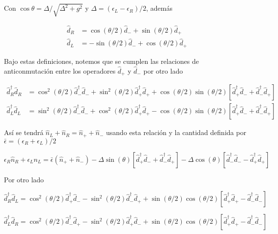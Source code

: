 \begin{appendixs}
Con $\cos \theta = \Delta/\sqrt{ \Delta^{2} + g^{2} }$ y $\Delta = (\epsilon_{L} - \epsilon_{R})/2$, además  

\begin{align*}
    \hat{d}_{R} & = \cos(\theta/2)\hat{d}_{-} + \sin(\theta/2)\hat{d}_{+} \\
    \hat{d}_{L} & = -\sin(\theta/2)\hat{d}_{-} + \cos(\theta/2)\hat{d}_{+}
\end{align*}

Bajo estas definiciones, notemos que se cumplen las relaciones de anticonmutación entre los operadores $\hat{d}_{+}$ y $\hat{d}_{-}$ por otro lado

\begin{align*}
    \hat{d}^{\dagger}_{R}\hat{d}_{R} & = \cos^{2}(\theta/2) \hat{d}^{\dagger}_{-}\hat{d}_{-} + \sin^{2}(\theta/2) \hat{d}^{\dagger}_{+}\hat{d}_{+} + \cos(\theta/2)\sin(\theta/2)[\hat{d}^{\dagger}_{+}\hat{d}_{-} + \hat{d}^{\dagger}_{-}\hat{d}_{+} ] \\
    \hat{d}^{\dagger}_{L}\hat{d}_{L} & = \sin^{2}(\theta/2) \hat{d}^{\dagger}_{-}\hat{d}_{-} + \cos^{2}(\theta/2) \hat{d}^{\dagger}_{+}\hat{d}_{+} - \cos(\theta/2)\sin(\theta/2)[\hat{d}^{\dagger}_{+}\hat{d}_{-} + \hat{d}^{\dagger}_{-}\hat{d}_{+} ]
\end{align*}

Así se tendrá $\hat{n}_{L} + \hat{n}_{R} = \hat{n}_{+} + \hat{n}_{-}$ usando esta relación y la cantidad definida por $\bar{\epsilon} = (\epsilon_{R} + \epsilon_{L})/2$ 

\begin{equation}
    \epsilon_{R} \hat{n}_{R} + \epsilon_{L} \hat{n}_{L}  = \bar{\epsilon}( \hat{n}_{+} + \hat{n}_{-} ) - \Delta \sin(\theta) [\hat{d}^{\dagger}_{+}\hat{d}_{-} + \hat{d}^{\dagger}_{-}\hat{d}_{+}] - \Delta \cos(\theta) [\hat{d}^{\dagger}_{-}\hat{d}_{-} - \hat{d}^{\dagger}_{+}\hat{d}_{+}]
\label{apendix5:ec1}
\end{equation}

Por otro lado 

\begin{equation}
    \hat{d}^{\dagger}_{R}\hat{d}_{L} = \cos^{2}(\theta/2)\hat{d}^{\dagger}_{+}\hat{d}_{-} - \sin^{2}(\theta/2) \hat{d}^{\dagger}_{-}\hat{d}_{+}  + \sin(\theta/2)\cos(\theta/2)[ \hat{d}^{\dagger}_{+}\hat{d}_{+} - \hat{d}^{\dagger}_{-}\hat{d}_{-} ]
    \label{apendix5:ec2}
\end{equation}

\begin{equation}
    \hat{d}^{\dagger}_{L}\hat{d}_{R} = \cos^{2}(\theta/2)\hat{d}^{\dagger}_{-}\hat{d}_{+} - \sin^{2}(\theta/2) \hat{d}^{\dagger}_{+}\hat{d}_{-}  + \sin(\theta/2)\cos(\theta/2)[ \hat{d}^{\dagger}_{+}\hat{d}_{+} - \hat{d}^{\dagger}_{-}\hat{d}_{-} ]
    \label{apendix5:ec3}
\end{equation}


\end{appendixs}
